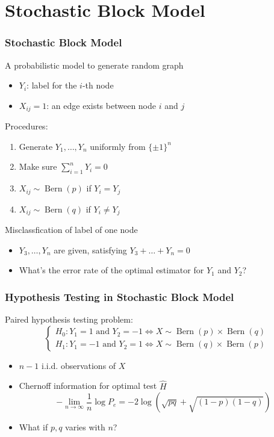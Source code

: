 \documentclass{beamer}
\DeclareMathOperator{\Bern}{Bern}
\begin{document}
\section{Stochastic Block Model}
\begin{frame}
\frametitle{
Stochastic Block Model} A probabilistic model to generate random graph
\begin{itemize}
\item $Y_i$: label for the $i$-th node
\item $X_{ij}=1$: an edge exists between node $i$ and $j$
\end{itemize}
Procedures:
\begin{enumerate}
\item Generate $Y_1, \dots, Y_n$ uniformly from $\{\pm 1\}^n$
\item Make sure $\sum_{i=1}^n Y_i = 0$
\item $X_{ij} \sim \Bern(p) $ if $Y_i=Y_j$
\item $X_{ij} \sim \Bern(q) $ if $Y_i \neq Y_j$
\end{enumerate}
Misclassfication of label of one node
\begin{itemize}
\item $Y_3, \dots, Y_n$ are given, satisfying $Y_3 + \dots + Y_n  = 0$
\item What's the error rate of the optimal estimator for $Y_1$ and $Y_2$?
\end{itemize}
\end{frame}
\begin{frame}
\frametitle{
Hypothesis Testing in Stochastic Block Model} 
Paired hypothesis testing problem:
\begin{equation*}
\begin{cases}
H_0: Y_1 = 1 \textrm{ and } Y_2 = -1 \iff X \sim \Bern(p) \times \Bern(q)\\
H_1: Y_1 = -1 \textrm{ and } Y_2 = 1 \iff X \sim \Bern(q) \times \Bern(p)
\end{cases}
\end{equation*}
\begin{itemize}
\item $n-1$ i.i.d.  observations of $X$
\item Chernoff information for optimal test $\widehat{H}$
\begin{equation*}
-\lim_{n\to\infty} \frac{1}{n}\log P_e = -2 \log (\sqrt{pq}+\sqrt{(1-p)(1-q)})
\end{equation*}
\item What if $p,q$ varies with $n$?
\end{itemize}
\end{frame}
\end{document}
